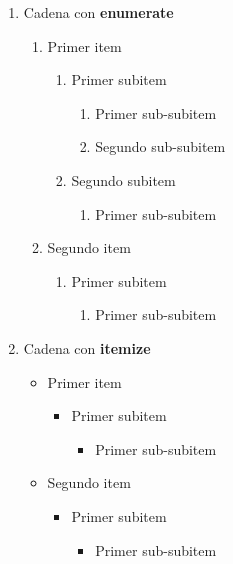 \documentclass[11pt,a4paper]{article}
\begin{document}
\begin{enumerate}

\item Cadena con {\bf enumerate}
\begin{enumerate}

\item Primer item
\begin{enumerate}
\item Primer subitem
\begin{enumerate}
\item Primer sub-subitem
\item Segundo sub-subitem
\end{enumerate}

\item Segundo subitem
\begin{enumerate}
\item Primer sub-subitem
\end{enumerate}
\end{enumerate}

\item Segundo item
\begin{enumerate}
\item Primer subitem
\begin{enumerate}
\item Primer sub-subitem
\end{enumerate}
\end{enumerate}
\end{enumerate}

\item Cadena con {\bf itemize}
\begin{itemize}
\item Primer item
\begin{itemize}
\item Primer subitem
\begin{itemize}
\item Primer sub-subitem
\end{itemize}
\end{itemize}

\item Segundo item
\begin{itemize}
\item Primer subitem
\begin{itemize}
\item Primer sub-subitem
\end{itemize}
\end{itemize}
\end{itemize}

\end{enumerate}
\end{document}
